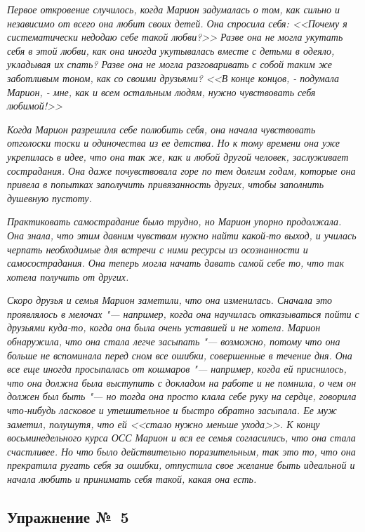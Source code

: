 \textit{Первое откровение случилось, когда Марион задумалась о том, как сильно и независимо от всего она любит своих детей. Она спросила себя: <<Почему я систематически недодаю себе такой любви?>> Разве она не могла укутать себя в этой любви, как она иногда укутывалась вместе с детьми в одеяло, укладывая их спать? Разве она не могла разговаривать с собой таким же заботливым тоном, как со своими друзьями? <<В конце концов, - подумала Марион, - мне, как и всем остальным людям, нужно чувствовать себя любимой!>>}

\textit{Когда Марион разрешила себе полюбить себя, она начала чувствовать отголоски тоски и одиночества из ее детства. Но к тому времени она уже укрепилась в идее, что она так же, как и любой другой человек, заслуживает сострадания. Она даже почувствовала горе по тем долгим годам, которые она привела в попытках заполучить привязанность других, чтобы заполнить душевную пустоту.}

\textit{Практиковать самострадание было трудно, но Марион упорно продолжала. Она знала, что этим давним чувствам нужно найти какой-то выход, и училась черпать необходимые для встречи с ними ресурсы из осознанности и самосострадания. Она теперь могла начать давать самой себе то, что так хотела получить от других.}

\textit{Скоро друзья и семья Марион заметили, что она изменилась. Сначала это проявлялось в мелочах "--- например, когда она научилась отказываться пойти с друзьями куда-то, когда она была очень уставшей и не хотела. Марион обнаружила, что она стала легче засыпать "--- возможно, потому что она больше не вспоминала перед сном все ошибки, совершенные в течение дня. Она все еще иногда просыпалась от кошмаров "--- например, когда ей приснилось, что она должна была выступить с докладом на работе и не помнила, о чем он должен был быть "--- но тогда она просто клала себе руку на сердце, говорила что-нибудь ласковое и утешительное и быстро обратно засыпала. Ее муж заметил, полушутя, что ей <<стало нужно меньше ухода>>. К концу восьминедельного курса ОСС Марион и вся ее семья согласились, что она стала счастливее. Но что было действительно поразительным, так это то, что она прекратила ругать себя за ошибки, отпустила свое желание быть идеальной и начала любить и принимать себя такой, какая она есть.}

\subsection{Упражнение №~5}

